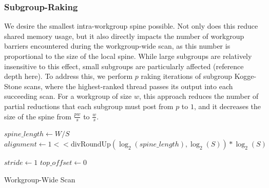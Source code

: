 \documentclass[sigconf]{acmart}
\begin{document}
\subsubsection{Subgroup-Raking}
We desire the smallest intra-workgroup spine possible. Not only does this reduce shared memory usage, but it also directly impacts the number of workgroup barriers encountered during the workgroup-wide scan, as this number is proportional to the size of the local spine. While large subgroups are relatively insensitive to this effect, small subgroups are particularly affected (reference depth here). To address this, we perform $p$ raking iterations of subgroup Kogge-Stone scans, where the highest-ranked thread passes its output into each succeeding scan. For a workgroup of size $w$, this approach reduces the number of partial reductions that each subgroup must post from $p$ to $1$, and it decreases the size of the spine from $\frac{pw}{s}$ to $\frac{w}{s}$.
\begin{algorithm}[htbp]
  \small
  \SetAlgoLined

  $spine\_length \gets W / S$\;
  $alignment \gets 1 << \text{divRoundUp}(\log_2(spine\_length), \log_2(S)) * \log_2(S)$\;

  $stride \gets 1$\;
  $top\_offset \gets 0$\;

  \;
  \caption{Workgroup-Wide Scan}
  \label{alg:example}
\end{algorithm}
\end{document}
